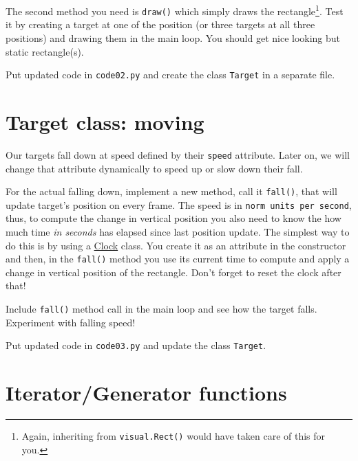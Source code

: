 \documentclass[
]{book}
\begin{document}
The second method you need is \texttt{draw()} which simply draws the rectangle\footnote{Again, inheriting from \texttt{visual.Rect()} would have taken care of this for you.}. Test it by creating a target at one of the position (or three targets at all three positions) and drawing them in the main loop. You should get nice looking but static rectangle(s).

Put updated code in \texttt{code02.py} and create the class \texttt{Target} in a separate file.

\hypertarget{target-class-moving}{%
\section{Target class: moving}\label{target-class-moving}}

Our targets fall down at speed defined by their \texttt{speed} attribute. Later on, we will change that attribute dynamically to speed up or slow down their fall.

For the actual falling down, implement a new method, call it \texttt{fall()}, that will update target's position on every frame. The speed is in \texttt{norm\ units\ per\ second}, thus, to compute the change in vertical position you also need to know the how much time \emph{in seconds} has elapsed since last position update. The simplest way to do this is by using a \href{https://psychopy.org/api/clock.html\#psychopy.clock.Clock}{Clock} class. You create it as an attribute in the constructor and then, in the \texttt{fall()} method you use its current time to compute and apply a change in vertical position of the rectangle. Don't forget to reset the clock after that!

Include \texttt{fall()} method call in the main loop and see how the target falls. Experiment with falling speed!

Put updated code in \texttt{code03.py} and update the class \texttt{Target}.

\hypertarget{iteratorgenerator-functions}{%
\section{Iterator/Generator functions}\label{iteratorgenerator-functions}}
\end{document}
